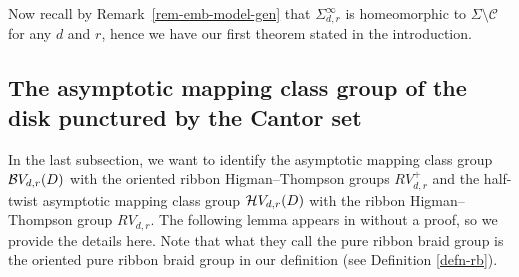 \documentclass[11pt, a4paper]{amsart}
\newtheorem{cor}[thm]{Corollary}
\theoremstyle{definition}
\newcommand{\CC}{{\mathcal {C}}}
\DeclareMathOperator{\Map}{Map}
\begin{document}
Now recall by Remark~\ref{rem-emb-model-gen} that $\Sigma_{d,r}^\infty$ is homeomorphic to $\Sigma \setminus \CC$ for any $d$ and $r$, hence we have our first theorem stated in the introduction.




\subsection{The asymptotic mapping class group of the disk punctured by the Cantor set}
In the last subsection, we want to identify the asymptotic mapping class group ${\mathcal {B}} V_{d,r}(D)$ with the oriented ribbon Higman--Thompson groups $RV^+_{d,r}$ and the half-twist asymptotic mapping class group ${\mathcal {H}} V_{d,r}(D)$ with the ribbon Higman--Thompson group $RV_{d,r}$. The following lemma appears in \cite[Section 2]{BT12} without a proof, so we provide the details here. Note that what they call the pure ribbon braid group is the oriented pure ribbon braid group in our definition (see Definition \ref{defn-rb}). 
\end{document}
